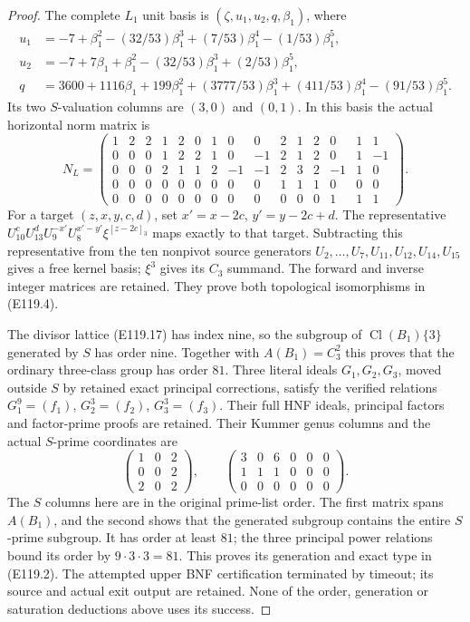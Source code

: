 \begin{proof}
The complete $L_1$ unit basis is
$(\zeta,u_1,u_2,q,\beta_1)$, where
\[
 \begin{aligned}
 u_1&=-7+\beta_1^2-(32/53)\beta_1^3
                  +(7/53)\beta_1^4-(1/53)\beta_1^5,\\
 u_2&=-7+7\beta_1+\beta_1^2-(32/53)\beta_1^3
                                      +(2/53)\beta_1^5,\\
 q&=3600+1116\beta_1+199\beta_1^2+(3777/53)\beta_1^3
                          +(411/53)\beta_1^4-(91/53)\beta_1^5.
 \end{aligned}
 \tag{E119.19}
\]
Its two $S$-valuation columns are $(3,0)$ and $(0,1)$.
In this basis the actual horizontal norm matrix is
\[
 N_L=\left(\begin{array}{*{15}{r}}
 1&2&2&1&2&0&1&0&0&2&1&2&0&1&1\\
 0&0&0&1&2&2&1&0&-1&2&1&2&0&1&-1\\
 0&0&0&2&1&1&2&-1&-1&2&3&2&-1&1&0\\
 0&0&0&0&0&0&0&0&0&1&1&1&0&0&0\\
 0&0&0&0&0&0&0&0&0&0&0&0&1&1&1
 \end{array}\right).
 \tag{E119.20}
\]
For a target $(z,x,y,c,d)$, set $x'=x-2c$,
$y'=y-2c+d$. The representative
$U_{10}^cU_{13}^dU_9^{-x'}U_8^{x'-y'}\xi^{[z-2c]_3}$
maps exactly to that target. Subtracting this representative
from the ten nonpivot source generators
$U_2,\ldots,U_7,U_{11},U_{12},U_{14},U_{15}$ gives
a free kernel basis; $\xi^3$ gives its $C_3$ summand.
The forward and inverse integer matrices are retained.
They prove both topological isomorphisms in (E119.4).

The divisor lattice (E119.17) has index nine, so the subgroup
of $\operatorname{Cl}(B_1)\{3\}$ generated by $S$ has order
nine. Together with $A(B_1)=C_3^2$ this proves that the ordinary
three-class group has order $81$. Three literal ideals
$G_1,G_2,G_3$, moved outside $S$ by retained exact principal
corrections, satisfy the verified relations
$G_1^9=(f_1)$, $G_2^3=(f_2)$, $G_3^3=(f_3)$.
Their full HNF ideals, principal factors and factor-prime proofs
are retained. Their Kummer genus columns and the actual $S$-prime
coordinates are
\[
 \begin{pmatrix}1&0&2\\0&0&2\\2&0&2\end{pmatrix},
 \qquad
 \begin{pmatrix}3&0&6&0&0&0\\1&1&1&0&0&0\\0&0&0&0&0&0\end{pmatrix}.
 \tag{E119.21}
\]
The $S$ columns here are in the original prime-list order.
The first matrix spans $A(B_1)$, and the second shows that
the generated subgroup contains the entire $S$-prime subgroup.
It has order at least $81$; the three principal power relations
bound its order by $9\cdot3\cdot3=81$.
This proves its generation and exact type in (E119.2).
The attempted upper BNF certification terminated by timeout;
its source and actual exit output are retained. None of the
order, generation or saturation deductions above uses its success.


\end{proof}
